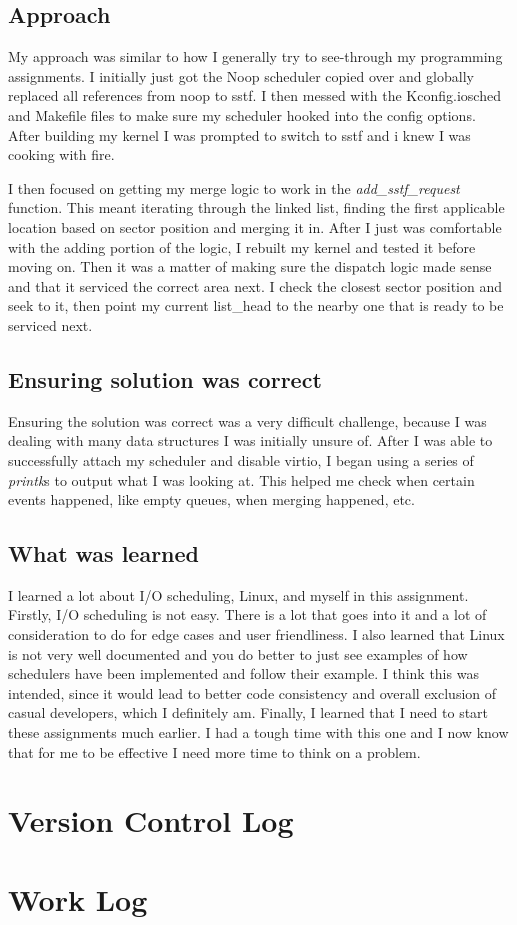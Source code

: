 \documentclass[10pt,draftclsnofoot,onecolumn]{IEEEtran}
\begin{document}
\subsection{Approach}
\par My approach was similar to how I generally try to see-through my programming assignments.
I initially just got the Noop scheduler copied over and globally replaced all references from noop to sstf.
I then messed with the Kconfig.iosched and Makefile files to make sure my scheduler hooked into the config options.
After building my kernel I was prompted to switch to sstf and i knew I was cooking with fire.

\par I then focused on getting my merge logic to work in the \textit{add\_sstf\_request} function.
This meant iterating through the linked list, finding the first applicable location based on sector position and merging it in.
After I just was comfortable with the adding portion of the logic, I rebuilt my kernel and tested it before moving on.
Then it was a matter of making sure the dispatch logic made sense and that it serviced the correct area next.
I check the closest sector position and seek to it, then point my current list\_head to the nearby one that is ready to be serviced next.

\subsection{Ensuring solution was correct}
Ensuring the solution was correct was a very difficult challenge, because I was dealing with many data structures I was initially unsure of.
After I was able to successfully attach my scheduler and disable virtio, I began using a series of \textit{printk}s to output what I was looking at.
This helped me check when certain events happened, like empty queues, when merging happened, etc.

\subsection{What was learned}
I learned a lot about I/O scheduling, Linux, and myself in this assignment.
Firstly, I/O scheduling is not easy.
There is a lot that goes into it and a lot of consideration to do for edge cases and user friendliness.
I also learned that Linux is not very well documented and you do better to just see examples of how schedulers have been implemented and follow their example.
I think this was intended, since it would lead to better code consistency and overall exclusion of casual developers, which I definitely am.
Finally, I learned that I need to start these assignments much earlier.
I had a tough time with this one and I now know that for me to be effective I need more time to think on a problem.

\section{Version Control Log}


\section{Work Log}

\end{document}
